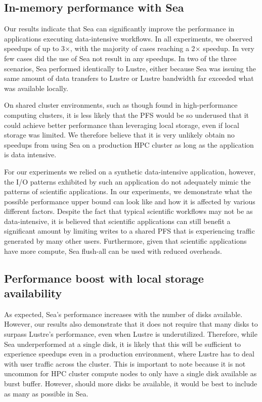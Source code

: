 \documentclass[10pt,journal,compsoc]{IEEEtran}
\begin{document}
    \subsection{In-memory performance with Sea}
   
    Our results indicate that Sea can significantly improve the performance in
    applications executing data-intensive workflows. In all experiments, we
    observed speedups of up to 3$\times$, with the majority of cases reaching a
    2$\times$ speedup. In very few cases did the use of Sea not result in any
    speedups. In two of the three scenarios, Sea performed identically to
    Lustre, either because Sea was issuing the same amount of data transfers to
    Lustre or Lustre bandwidth far exceeded what was available locally.

    On shared cluster environments, such as though found in high-performance
    computing clusters, it is less likely that the PFS would be so underused
    that it could achieve better performance than leveraging local storage, even
    if local storage was limited. We therefore believe that it is very unlikely
    obtain no speedups from using Sea on a production HPC cluster as long as the
    application is data intensive.
    
    For our experiments we relied on a synthetic data-intensive application,
    however, the I/O patterns exhibited by such an application do not adequately
    mimic the patterns of scientific applications. In our experiments, we
    demonstrate what the possible performance upper bound can look like and how
    it is affected by various different factors. Despite the fact that typical
    scientific workflows may not be as data-intensive, it is believed that
    scientific applications can still benefit a significant amount by limiting
    writes to a shared PFS that is experiencing traffic generated by many other
    users. Furthermore, given that scientific applications have more compute,
    Sea flush-all can be used with reduced overheads.

    \subsection{Performance boost with local storage availability}

    As expected, Sea's performance increases with the number of disks available.
    However, our results also demonstrate that it does not require that many
    disks to surpass Lustre's performance, even when Lustre is underutilized.
    Therefore, while Sea underperformed at a single disk, it is likely that this
    will be sufficient to experience speedups even in a production environment,
    where Lustre has to deal with user traffic across the cluster. This is
    important to note because it is not uncommon for HPC cluster compute nodes
    to only have a single disk available as burst buffer. However, should more
    disks be available, it would be best to include as many as possible in Sea.
\end{document}
